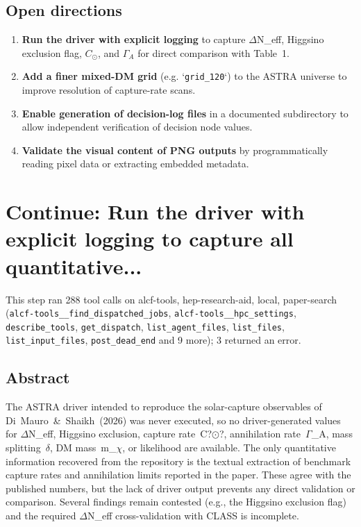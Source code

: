 \documentclass[11pt,a4paper]{article}
\begin{document}
\subsection{Open directions}
\begin{enumerate}
  \item \textbf{Run the driver with explicit logging} to capture $\Delta$N\_eff, Higgsino exclusion flag, $C_{\odot}$, and $\Gamma_{A}$ for direct comparison with Table~1.
  \item \textbf{Add a finer mixed-DM grid} (e.g. `\texttt{grid\_\allowbreak{}120}`) to the ASTRA universe to improve resolution of capture-rate scans.
  \item \textbf{Enable generation of decision-log files} in a documented subdirectory to allow independent verification of decision node values.
  \item \textbf{Validate the visual content of PNG outputs} by programmatically reading pixel data or extracting embedded metadata.
\end{enumerate}

\section{Continue: Run the driver with explicit logging to capture all quantitative...}
This step ran 288 tool calls on alcf-tools, hep-research-aid, local, paper-search (\texttt{alcf-tools\_\_find\_dispatched\_jobs}, \texttt{alcf-tools\_\_hpc\_settings}, \texttt{describe\_tools}, \texttt{get\_dispatch}, \texttt{list\_agent\_files}, \texttt{list\_files}, \texttt{list\_input\_files}, \texttt{post\_dead\_end} and 9 more); 3 returned an error.\par
\subsection{Abstract}
The ASTRA driver intended to reproduce the solar-capture observables of Di~Mauro~\&~Shaikh~(2026) was never executed, so no driver-generated values for $\Delta$N\_eff, Higgsino exclusion, capture rate~C?$\odot$?, annihilation rate~$\Gamma$\_A, mass splitting~$\delta$, DM mass~m\_$\chi$, or likelihood are available. The only quantitative information recovered from the repository is the textual extraction of benchmark capture rates and annihilation limits reported in the paper. These agree with the published numbers, but the lack of driver output prevents any direct validation or comparison. Several findings remain contested (e.g., the Higgsino exclusion flag) and the required $\Delta$N\_eff cross-validation with CLASS is incomplete.
\end{document}
